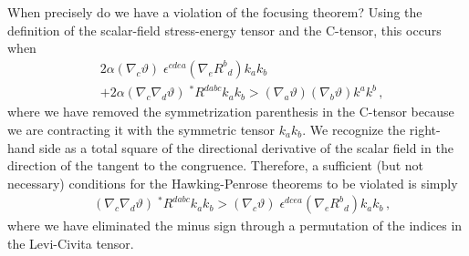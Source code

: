 \documentclass[prd,twocolumn,showpacs,superscriptaddress,nofootinbib]{revtex4-2}
\begin{document}
When precisely do we have a violation of the focusing theorem? Using the definition of the scalar-field stress-energy tensor and the C-tensor, this occurs when
%
\begin{align}
\label{ineq}
& 2 \alpha \left(\nabla_{c} \vartheta \right) \; \epsilon^{cdea} \left(\nabla_{e} R^{b}{}_{d}\right) k_{a} k_{b}
\nonumber \\
&+ 2 \alpha \left(\nabla_{c} \nabla_{d} \vartheta \right) \; {}^{\ast}R^{dabc} k_{a}k_{b} > \left(\nabla_{a} \vartheta \right) \left( \nabla_{b} \vartheta \right) k^{a}k^{b}\,,
\end{align}
%
where we have removed the symmetrization parenthesis in the C-tensor because we are contracting it with the symmetric tensor $k_a k_b$. We recognize the right-hand side as a total square of the directional derivative of the scalar field in the direction of the tangent to the congruence. Therefore, a sufficient (but not necessary) conditions for the Hawking-Penrose theorems to be violated is simply
%
\begin{align}
\label{ineq2}
&\left(\nabla_{c} \nabla_{d} \vartheta \right) \; {}^{\ast}R^{dabc} k_{a}k_{b} > \left(\nabla_{c} \vartheta \right) \; \epsilon^{dcea} \left(\nabla_{e} R^{b}{}_{d}\right) k_{a} k_{b}\,,
\end{align}
%
where we have eliminated the minus sign through a permutation of the indices in the Levi-Civita tensor. 
\end{document}
